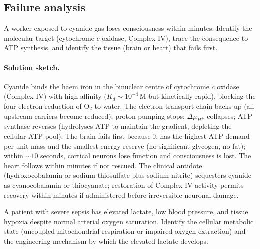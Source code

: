 \subsection*{Failure analysis}

\begin{exercise}
A worker exposed to cyanide gas loses consciousness within minutes.
Identify the molecular target (cytochrome $c$ oxidase, Complex IV),
trace the consequence to ATP synthesis, and identify the tissue
(brain or heart) that fails first.
\end{exercise}

\paragraph{Solution sketch.}
Cyanide binds the haem iron in the binuclear centre of cytochrome
$c$ oxidase (Complex IV) with high affinity ($K_d \sim 10^{-4}\,
\text{M}$ but kinetically rapid), blocking the four-electron
reduction of O$_2$ to water. The electron transport chain backs up
(all upstream carriers become reduced); proton pumping stops;
$\Delta \mu_{H^+}$ collapses; ATP synthase reverses (hydrolyses ATP
to maintain the gradient, depleting the cellular ATP pool). The
brain fails first because it has the highest ATP demand per unit
mass and the smallest energy reserve (no significant glycogen, no
fat); within $\sim 10$ seconds, cortical neurons lose function and
consciousness is lost. The heart follows within minutes if not
rescued. The clinical antidote (hydroxocobalamin or
sodium thiosulfate plus sodium nitrite) sequesters cyanide as
cyanocobalamin or thiocyanate; restoration of Complex IV activity
permits recovery within minutes if administered before irreversible
neuronal damage.

\begin{exercise}
A patient with severe sepsis has elevated lactate, low blood pressure,
and tissue hypoxia despite normal arterial oxygen saturation. Identify
the cellular metabolic state (uncoupled mitochondrial respiration or
impaired oxygen extraction) and the engineering mechanism by which
the elevated lactate develops.
\end{exercise}

